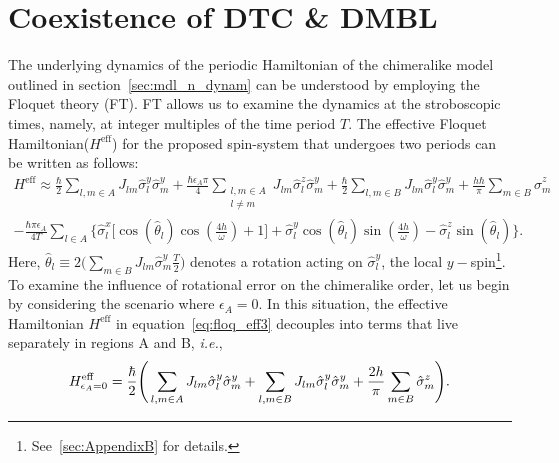 \documentclass[12pt]{iopart}
\begin{document}
\section{\label{sec:level3}Coexistence of DTC \& DMBL}	
The underlying dynamics of the periodic Hamiltonian of the chimeralike model outlined in section~\ref{sec:mdl_n_dynam} can be understood by employing the Floquet theory (FT). FT allows us to examine the dynamics at the stroboscopic times, namely, at integer multiples of the time period $T$. The effective Floquet Hamiltonian($H^{\mathrm{eff}}$) for the proposed spin-system that undergoes two periods can be written as follows:
\begin{multline}
    H^{\mathrm{eff}} \approx\frac{\hbar}{2} \sum_{l,m\in A}J_{lm}\hat{\sigma}_l^y\hat{\sigma}_m^y +\frac{\hbar \epsilon_A \pi}{4} \sum_{\substack{l,m\in A\\l\neq m}} J_{lm}\hat{\sigma}^z_l\hat{\sigma}^y_m + \frac{\hbar}{2}\sum_{l,m\in B}J_{lm}\hat{\sigma}_l^y \hat{\sigma}_m^y + \frac{h\hbar}{\pi}\sum_{m \in B}\hat{\sigma}^z_m \\ -\frac{\hbar \pi \epsilon_A}{4T}\sum_{l\in A}\Bigg\{\hat{\sigma}^x_l \bigg[\cos(\hat{\theta}_l)\cos(\frac{4h}{\omega})+1 \bigg] + \hat{\sigma}^y_l \cos(\hat{\theta}_l)\sin(\frac{4h}{\omega})-\hat{\sigma}^z_l \sin(\hat{\theta}_l)\Bigg\}.
    \label{eq:floq_eff3}
\end{multline}
Here, $\displaystyle \hat{\theta}_l \equiv 2 \Big(\sum_{m \in B}J_{lm}\hat{\sigma}^y_m \frac{T}{2} \Big)$ denotes a rotation acting on $\hat{\sigma}^y_l$, the local $y-$spin\footnote{See~\ref{sec:AppendixB} for details.}. 
To examine the influence of rotational error on the chimeralike order, let us begin by considering the scenario where $\epsilon_A=0$. In this situation, the effective Hamiltonian $H^\mathrm{eff}$ in equation~\eqref{eq:floq_eff3}  decouples into terms that live separately in regions A and B, \textit{i.e.},
\begin{equation}
    H^{\mathrm{eff}}_{\epsilon_A=0} =  \frac{\hbar}{2}\Bigg( \sum_{l,m\in A} J_{lm} \hat{\sigma}^y_l\hat{\sigma}^y_m +\sum_{l,m\in B} J_{lm} \hat{\sigma}^y_l\hat{\sigma}^y_m\\+\frac{2h }{\pi}\sum_{m \in B}\hat{\sigma}^z_m\Bigg).
\end{equation}
	
\end{document}
